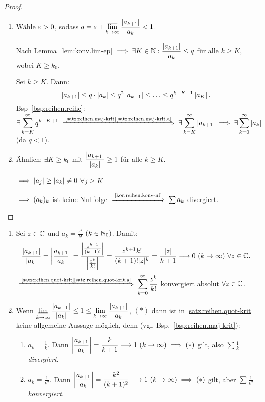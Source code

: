 \documentclass[12pt]{scrreprt}
\begin{document}
\begin{proof}
\begin{enumerate}%
\item Wähle $\varepsilon>0$, sodass $\displaystyle q=\varepsilon+\varlimsup_{k\rightarrow\infty}\frac{\left\lvert a_{k+1}\right\lvert}{\left\lvert a_k\right\lvert}<1$.

Nach Lemma~\ref{lem:konv.lim-ep} $\displaystyle\implies\exists K\in\mathbb{N}: \frac{\left\lvert a_{k+1}\right\lvert}{\left\lvert a_k\right\lvert}\leq q$ für alle $k\geq K$, wobei $K\geq k_0$.

Sei $k\geq K$. Dann:
\[\left\lvert a_{k+1}\right\lvert\leq q\cdot\left\lvert a_k\right\lvert\leq q^2\left\lvert a_{k-1}\right\lvert\leq\dotso\leq q^{k-K+1}\left\lvert a_K\right\lvert.\]
Bsp~\ref{bsp:reihen.reihe}: $\displaystyle\exists\sum^\infty_{k=K}q^{k-K+1}\folgtwegen{\text{\ref{satz:reihen.maj-krit}\ref{satz:reihen.maj-krit.a}}}\exists\sum^\infty_{k=K}\abs{a_{k+1}}\folgt\exists\sum^\infty_{k=0}\abs{a_k}$ (da $q<1$).

\item Ähnlich: $\exists K\geq k_0$ mit $\displaystyle\frac{\left\lvert a_{k+1}\right\lvert}{\left\lvert a_k\right\lvert}\geq 1$ für alle $k\geq K$.

$\implies\left\lvert a_j\right\lvert\geq\left\lvert a_k\right\lvert\neq 0$ $\forall j\geq K$

$\implies (a_k)_k$ ist keine Nullfolge $\folgtwegen{\text{\ref{kor:reihen.konv-nf}}}\sum a_k$ divergiert.
\end{enumerate}
\end{proof}

\begin{bsp}
  \label{bsp:reihen.quot-krit}
  \begin{enumerate}%
  \item Sei $z\in\mathbb{C}$ und $\displaystyle a_k = \frac{z^k}{k!}$ $(k\in\mathbb{N}_0)$. Damit:
  \[\frac{\abs{a_{k+1}}}{\abs{a_k}} = \abs{\frac{a_{k+1}}{a_k}} = \frac{\abs{\frac{z^{k+1}}{(k+1)!}}}{\abs{\frac{z^k}{k!}}} = \frac{z^{k+1}k!}{(k+1)!|z|^k} = \frac{|z|}{k+1}\lra 0\ (\kinf)\ \forall\kmplx{z}.\]
  $\displaystyle\folgtwegen{\text{\ref{satz:reihen.quot-krit}\ref{satz:reihen.quot-krit.a}}}\sum^\infty_{k=0}\frac{z^k}{k!}$ konvergiert absolut $\forall z\in\mathbb{C}$.
  
  \item\label{bsp:reihen.quot-krit-b} Wenn $\displaystyle\varliminf_{k\rightarrow\infty}\frac{\left\lvert a_{k+1}\right\lvert}{\left\lvert a_k\right\lvert}\leq 1\leq\varlimsup_{k\rightarrow\infty}\frac{\left\lvert a_{k+1}\right\lvert}{\left\lvert a_k\right\lvert}$, $(*)$ dann ist in \ref{satz:reihen.quot-krit} keine allgemeine Aussage möglich, denn (vgl. Bsp.~\ref{bsp:reihen.maj-krit}):
  \begin{enumerate}%
  \item $\displaystyle a_k = \frac{1}{k}$. Dann $\displaystyle\left\lvert\frac{a_{k+1}}{a_k}\right\lvert = \frac{k}{k+1}\longrightarrow 1\ (k\rightarrow\infty)\implies(*)$ gilt, also $\displaystyle\sum\frac{1}{k}$ \emph{divergiert}.
  
  \item $\displaystyle a_k = \frac{1}{k^2}$. Dann $\displaystyle\left\lvert\frac{a_{k+1}}{a_k}\right\lvert = \frac{k^2}{(k+1)^2}\longrightarrow 1\ (k\rightarrow\infty)\implies(*)$ gilt, aber $\displaystyle\sum\frac{1}{k^2}$ \emph{konvergiert}.
  \end{enumerate}
  \end{enumerate}
\end{bsp}
\end{document}
